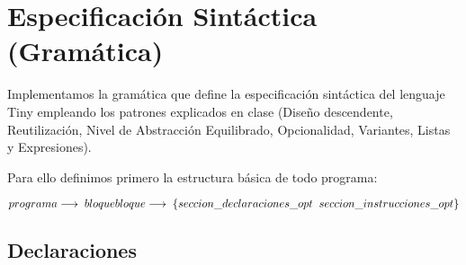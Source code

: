 \section{Especificación Sintáctica (Gramática)}

Implementamos la gramática que define la especificación sintáctica del lenguaje Tiny empleando los patrones explicados en clase 
(Diseño descendente, Reutilización, Nivel de Abstracción Equilibrado, Opcionalidad, Variantes, Listas y Expresiones). 

Para ello definimos primero la estructura básica de todo programa:

\begin{math}
    programa \longrightarrow \; bloque \\
    bloque \longrightarrow \; \{ seccion\_declaraciones\_opt \;\; seccion\_instrucciones\_opt \}
\end{math}

\subsection{Declaraciones}

